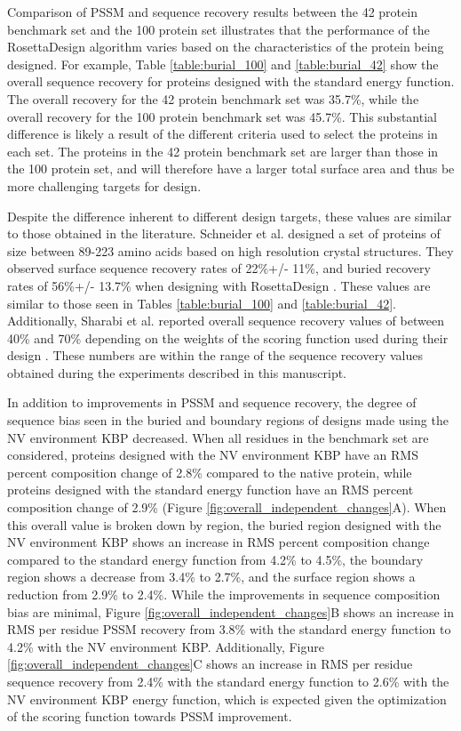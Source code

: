 Comparison of \ac{PSSM} and sequence recovery results between the 42 protein benchmark set and the 100 protein set illustrates that the performance of the RosettaDesign algorithm varies based on the characteristics of the protein being designed.
For example, Table \ref{table:burial_100} and \ref{table:burial_42} show the overall sequence recovery for proteins designed with the standard energy function.
The overall recovery for the 42 protein benchmark set was 35.7\%, while the overall recovery for the 100 protein benchmark set was 45.7\%.
This substantial difference is likely a result of the different criteria used to select the proteins in each set.
The proteins in the 42 protein benchmark set are larger than those in the 100 protein set, and will therefore have a larger total surface area and thus be more challenging targets for design.

Despite the difference inherent to different design targets, these values are similar to those obtained in the literature.
Schneider et al. designed a set of proteins of size between 89-223 amino acids based on high resolution crystal structures.
They observed surface sequence recovery rates of 22\%+/- 11\%, and buried recovery rates of 56\%+/- 13.7\% when designing with RosettaDesign \citep{Schneider:2009ig}.
These values are similar to those seen in Tables \ref{table:burial_100} and \ref{table:burial_42}.
Additionally, Sharabi et al. reported overall sequence recovery values of between 40\% and 70\% depending on the weights of the scoring function used during their design \citep{Sharabi:2011ev}.
These numbers are within the range of the sequence recovery values obtained during the experiments described in this manuscript.

In addition to improvements in \ac{PSSM} and sequence recovery, the degree of sequence bias seen in the buried and boundary regions of designs made using the \ac{NV} environment \ac{KBP} decreased.
When all residues in the benchmark set are considered, proteins designed with the \ac{NV} environment \ac{KBP} have an \ac{RMS} percent composition change of 2.8\% compared to the native protein, while proteins designed with the standard energy function have an \ac{RMS} percent composition change of 2.9\% (Figure \ref{fig:overall_independent_changes}A).
When this overall value is broken down by region, the buried region designed with the \ac{NV} environment \ac{KBP} shows an increase in \ac{RMS} percent composition change compared to the standard energy function from 4.2\% to 4.5\%, the boundary region shows a decrease from 3.4\% to 2.7\%, and the surface region shows a reduction from 2.9\% to 2.4\%.
While the improvements in sequence composition bias are minimal, Figure \ref{fig:overall_independent_changes}B shows an increase in \ac{RMS} per residue \ac{PSSM} recovery from 3.8\% with the standard energy function to 4.2\% with the \ac{NV} environment \ac{KBP}.
Additionally, Figure \ref{fig:overall_independent_changes}C shows an increase in \ac{RMS} per residue sequence recovery from 2.4\% with the standard energy function to 2.6\% with the \ac{NV} environment \ac{KBP} energy function, which is expected given the optimization of the scoring function towards \ac{PSSM} improvement. 

